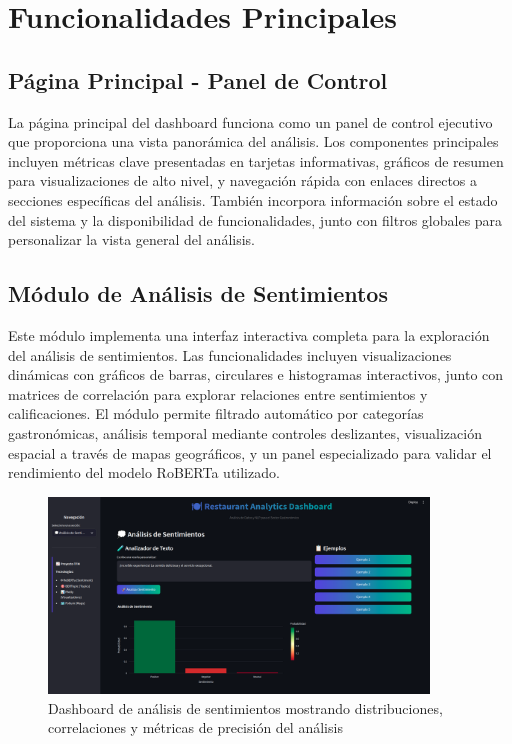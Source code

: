 \documentclass[12pt,a4paper,twoside,openany]{book}
\begin{document}
\section{Funcionalidades Principales}

\subsection{Página Principal - Panel de Control}

La página principal del dashboard funciona como un panel de control ejecutivo que proporciona una vista panorámica del análisis. Los componentes principales incluyen métricas clave presentadas en tarjetas informativas, gráficos de resumen para visualizaciones de alto nivel, y navegación rápida con enlaces directos a secciones específicas del análisis. También incorpora información sobre el estado del sistema y la disponibilidad de funcionalidades, junto con filtros globales para personalizar la vista general del análisis.

\subsection{Módulo de Análisis de Sentimientos}

Este módulo implementa una interfaz interactiva completa para la exploración del análisis de sentimientos. Las funcionalidades incluyen visualizaciones dinámicas con gráficos de barras, circulares e histogramas interactivos, junto con matrices de correlación para explorar relaciones entre sentimientos y calificaciones. El módulo permite filtrado automático por categorías gastronómicas, análisis temporal mediante controles deslizantes, visualización espacial a través de mapas geográficos, y un panel especializado para validar el rendimiento del modelo RoBERTa utilizado.

\begin{figure}[H]
\centering
\includegraphics[width=0.9\textwidth]{figures/streamlit_sentimental_analysis.png}
\caption{Dashboard de análisis de sentimientos mostrando distribuciones, correlaciones y métricas de precisión del análisis}
\label{fig:streamlit_sentiment_analysis}
\end{figure}
\end{document}
